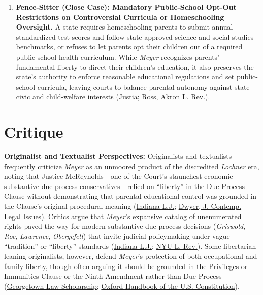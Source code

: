 \documentclass[12pt]{article}
\begin{document}
\begin{enumerate}
\item \textbf{Fence-Sitter (Close Case): Mandatory Public-School Opt-Out Restrictions on Controversial Curricula or Homeschooling Oversight.} A state requires homeschooling parents to submit annual standardized test scores and follow state-approved science and social studies benchmarks, or refuses to let parents opt their children out of a required public-school health curriculum. While \textit{Meyer} recognizes parents' fundamental liberty to direct their children's education, it also preserves the state's authority to enforce reasonable educational regulations and set public-school curricula, leaving courts to balance parental autonomy against state civic and child-welfare interests (\href{https://supreme.justia.com/cases/federal/us/262/390/}{Justia}; \href{https://ideaexchange.uakron.edu/cgi/viewcontent.cgi?article=1397&context=akronlawreview}{Ross, Akron L. Rev.}).
\end{enumerate}

\section{Critique}

\textbf{Originalist and Textualist Perspectives:} Originalists and textualists frequently criticize \textit{Meyer} as an unmoored product of the discredited \textit{Lochner} era, noting that Justice McReynolds---one of the Court's staunchest economic substantive due process conservatives---relied on ``liberty'' in the Due Process Clause without demonstrating that parental educational control was grounded in the Clause's original procedural meaning (\href{https://www.repository.law.indiana.edu/cgi/viewcontent.cgi?article=2021&context=ilj}{Indiana L.J.}; \href{https://digital.sandiego.edu/cgi/viewcontent.cgi?article=1071&context=jcli}{Dwyer, J. Contemp. Legal Issues}). Critics argue that \textit{Meyer}'s expansive catalog of unenumerated rights paved the way for modern substantive due process decisions (\textit{Griswold}, \textit{Roe}, \textit{Lawrence}, \textit{Obergefell}) that invite judicial policymaking under vague ``tradition'' or ``liberty'' standards (\href{https://www.repository.law.indiana.edu/cgi/viewcontent.cgi?article=2021&context=ilj}{Indiana L.J.}; \href{https://www.law.nyu.edu/sites/default/files/ECM_PRO_062707.pdf}{NYU L. Rev.}). Some libertarian-leaning originalists, however, defend \textit{Meyer}'s protection of both occupational and family liberty, though often arguing it should be grounded in the Privileges or Immunities Clause or the Ninth Amendment rather than Due Process (\href{https://scholarship.law.georgetown.edu/cgi/viewcontent.cgi?article=1041&context=facpub}{Georgetown Law Scholarship}; \href{https://scholarship.law.bu.edu/cgi/viewcontent.cgi?filename=0&article=1372&context=faculty_scholarship&type=additional}{Oxford Handbook of the U.S. Constitution}).
\end{document}
